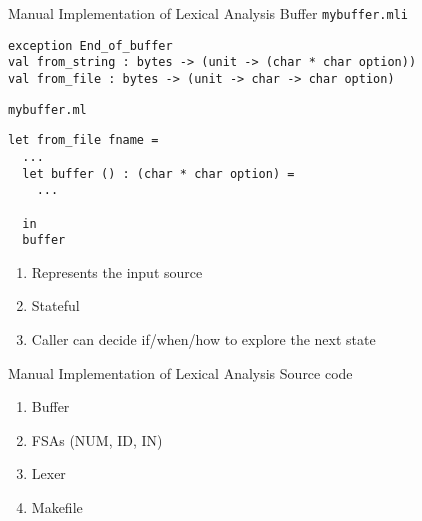 \documentclass{beamer}
\begin{document}
\begin{frame}[fragile]{Manual Implementation of Lexical Analysis}
{Buffer}
\texttt{\color{Brown}mybuffer.mli}
\begin{lstlisting}[style=camlcode]
exception End_of_buffer
val from_string : bytes -> (unit -> (char * char option))
val from_file : bytes -> (unit -> char -> char option)
\end{lstlisting}

\texttt{\color{Brown}mybuffer.ml}
\begin{lstlisting}[style=camlcode]
let from_file fname =
  ...
  let buffer () : (char * char option) =
    ...
    
  in
  buffer
\end{lstlisting}

\begin{enumerate}
	\item Represents the input source
	
	\item Stateful
	\item Caller can decide if/when/how to explore the next state
\end{enumerate}
\end{frame}


\begin{frame}[fragile]{Manual Implementation of Lexical Analysis}
{Source code}

\begin{scriptsize}

\begin{enumerate}
\item Buffer
\item FSAs (NUM, ID, IN)
\item Lexer
\item Makefile
\end{enumerate}
\end{scriptsize}
\end{frame}
\end{document}
